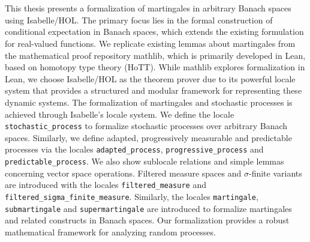 ﻿\chapter{\abstractname}
This thesis presents a formalization of martingales in arbitrary Banach spaces using Isabelle/HOL. The primary focus lies in the formal construction of conditional expectation in Banach spaces, which extends the existing formulation for real-valued functions. We replicate existing lemmas about martingales from the mathematical proof repository mathlib, which is primarily developed in Lean, based on homotopy type theory (HoTT). While mathlib explores formalization in Lean, we choose Isabelle/HOL as the theorem prover due to its powerful locale system that provides a structured and modular framework for representing these dynamic systems. The formalization of martingales and stochastic processes is achieved through Isabelle's locale system. We define the locale \lstinline{stochastic_process} to formalize stochastic processes over arbitrary Banach spaces. Similarly, we define adapted, progressively measurable and predictable processes via the locales \lstinline{adapted_process}, \lstinline{progressive_process} and \lstinline{predictable_process}. We also show sublocale relations and simple lemmas concerning vector space operations. Filtered measure spaces and $\sigma$-finite variants are introduced with the locales \lstinline{filtered_measure} and \lstinline{filtered_sigma_finite_measure}. Similarly, the locales \lstinline{martingale}, \lstinline{submartingale} and \lstinline{supermartingale} are introduced to formalize martingales and related constructs in Banach spaces. Our formalization provides a robust mathematical framework for analyzing random processes.